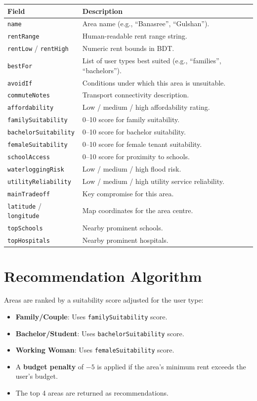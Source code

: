 \documentclass[12pt, a4paper, oneside]{report}
\begin{document}
\begin{longtable}{p{5cm} p{8cm}}
\toprule
\textbf{Field} & \textbf{Description} \\
\midrule
\endhead
\texttt{name} & Area name (e.g., ``Banasree'', ``Gulshan''). \\
\texttt{rentRange} & Human-readable rent range string. \\
\texttt{rentLow} / \texttt{rentHigh} & Numeric rent bounds in BDT. \\
\texttt{bestFor} & List of user types best suited (e.g., ``families'', ``bachelors''). \\
\texttt{avoidIf} & Conditions under which this area is unsuitable. \\
\texttt{commuteNotes} & Transport connectivity description. \\
\texttt{affordability} & Low / medium / high affordability rating. \\
\texttt{familySuitability} & 0--10 score for family suitability. \\
\texttt{bachelorSuitability} & 0--10 score for bachelor suitability. \\
\texttt{femaleSuitability} & 0--10 score for female tenant suitability. \\
\texttt{schoolAccess} & 0--10 score for proximity to schools. \\
\texttt{waterloggingRisk} & Low / medium / high flood risk. \\
\texttt{utilityReliability} & Low / medium / high utility service reliability. \\
\texttt{mainTradeoff} & Key compromise for this area. \\
\texttt{latitude} / \texttt{longitude} & Map coordinates for the area centre. \\
\texttt{topSchools} & Nearby prominent schools. \\
\texttt{topHospitals} & Nearby prominent hospitals. \\
\bottomrule
\end{longtable}

\section{Recommendation Algorithm}

Areas are ranked by a suitability score adjusted for the user type:

\begin{itemize}[leftmargin=2em]
  \item \textbf{Family/Couple}: Uses \texttt{familySuitability} score.
  \item \textbf{Bachelor/Student}: Uses \texttt{bachelorSuitability} score.
  \item \textbf{Working Woman}: Uses \texttt{femaleSuitability} score.
  \item A \textbf{budget penalty} of $-5$ is applied if the area's minimum rent exceeds the user's budget.
  \item The top 4 areas are returned as recommendations.
\end{itemize}
\end{document}
